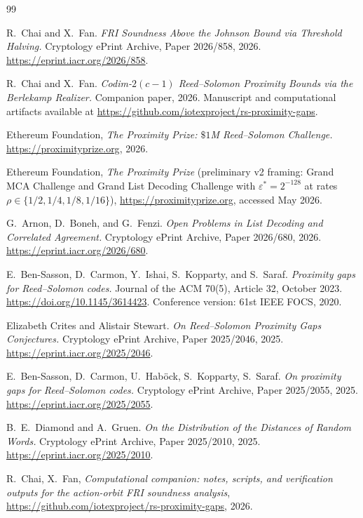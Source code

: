 \documentclass[11pt]{article}
\theoremstyle{definition}
\theoremstyle{remark}
\begin{document}
\begin{thebibliography}{99}

R.~Chai and X.~Fan.
\emph{FRI Soundness Above the Johnson Bound via Threshold Halving.}
Cryptology ePrint Archive, Paper 2026/858, 2026.
\url{https://eprint.iacr.org/2026/858}.

R.~Chai and X.~Fan.
\emph{Codim-$2(c{-}1)$ Reed--Solomon Proximity Bounds via the
Berlekamp Realizer.}
Companion paper, 2026.
Manuscript and computational artifacts available at
\url{https://github.com/iotexproject/rs-proximity-gaps}.

Ethereum Foundation,
\emph{The Proximity Prize: $\$1$M Reed--Solomon Challenge.}
\url{https://proximityprize.org}, 2026.

Ethereum Foundation,
\emph{The Proximity Prize} (preliminary v2 framing: Grand MCA
Challenge and Grand List Decoding Challenge with $\varepsilon^* =
2^{-128}$ at rates $\rho \in \{1/2, 1/4, 1/8, 1/16\}$),
\url{https://proximityprize.org}, accessed May 2026.

G.~Arnon, D.~Boneh, and G.~Fenzi.
\emph{Open Problems in List Decoding and Correlated Agreement.}
Cryptology ePrint Archive, Paper 2026/680, 2026.
\url{https://eprint.iacr.org/2026/680}.

E.~Ben-Sasson, D.~Carmon, Y.~Ishai, S.~Kopparty, and S.~Saraf.
\emph{Proximity gaps for Reed--Solomon codes.}
Journal of the ACM 70(5), Article 32, October 2023.
\url{https://doi.org/10.1145/3614423}.
Conference version: 61st IEEE FOCS, 2020.

Elizabeth Crites and Alistair Stewart.
\emph{On Reed--Solomon Proximity Gaps Conjectures.}
Cryptology ePrint Archive, Paper 2025/2046, 2025.
\url{https://eprint.iacr.org/2025/2046}.

E.~Ben-Sasson, D.~Carmon, U.~Hab\"{o}ck, S.~Kopparty, S.~Saraf.
\emph{On proximity gaps for Reed--Solomon codes.}
Cryptology ePrint Archive, Paper 2025/2055, 2025.
\url{https://eprint.iacr.org/2025/2055}.

B.~E.~Diamond and A.~Gruen.
\emph{On the Distribution of the Distances of Random Words.}
Cryptology ePrint Archive, Paper 2025/2010, 2025.
\url{https://eprint.iacr.org/2025/2010}.

R.~Chai, X.~Fan,
\emph{Computational companion: notes, scripts, and verification outputs
for the action-orbit FRI soundness analysis},
\url{https://github.com/iotexproject/rs-proximity-gaps}, 2026.


\end{thebibliography}
\end{document}
